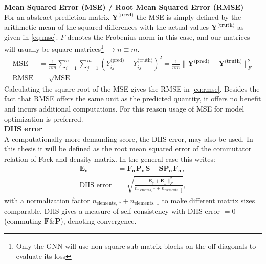 \textbf{Mean Squared Error (MSE) / Root Mean Squared Error (RMSE)}\\
For an abstract prediction matrix $\mathbf{Y^\text{(pred)}}$ the MSE is simply defined by the arithmetic mean of the squared differences with the actual values $\mathbf{Y^\text{(truth)}}$ as given in \autoref{eq:mse}. $F$ denotes the Frobenius norm in this case, and our matrices will usually be square matrices\footnote{Only the GNN will use non-square sub-matrix blocks on the off-diagonals to evaluate its loss} $\rightarrow n \equiv m$.  
\begin{subequations}
\begin{align}
\text{MSE} &= \frac{1}{nm} \sum_{i=1}^{n} \sum_{j=1}^{m} \left( Y^\text{(pred)}_{ij} - Y^\text{(truth)}_{ij} \right)^2 = \frac{1}{nm} \|\mathbf{Y^\text{(pred)}} - \mathbf{Y^\text{(truth)}}\|_F^2 \label{eq:mse}\\
\text{RMSE} &= \sqrt{ \text{MSE}}\label{eq:rmse}
\end{align}
\end{subequations}
Calculating the square root of the MSE gives the RMSE in \autoref{eq:rmse}. Besides the fact that RMSE offers the same unit as the predicted quantity, it offers no benefit and incurs additional computations. For this reason usage of MSE for model optimization is preferred. \\

\textbf{DIIS error}\\
A computationally more demanding score, the DIIS error, may also be used. In this thesis it will be defined as the root mean squared error of the commutator relation of Fock and density matrix. In the general case this writes: 
\begin{subequations}
\begin{align}
\mathbf{E_\sigma} &= \mathbf{F_\sigma} \mathbf{P_\sigma} \mathbf{S} - \mathbf{S} \mathbf{P_\sigma} \mathbf{F_\sigma},\\
\text{DIIS error} &= \sqrt{\frac{\|\mathbf{E_\uparrow} + \mathbf{E_\downarrow}\|^2_F}{n_\text{elements, $\uparrow$} + n_\text{elements, $\downarrow$}}},\label{eq:diis_error}
\end{align}
\end{subequations}
with a normalization factor $n_\text{elements, $\uparrow$} + n_\text{elements, $\downarrow$}$ to make different matrix sizes comparable. DIIS gives a measure of self consistency with DIIS error $=0$ (commuting $\mathbf{F} \& \mathbf{P}$), denoting convergence. 
